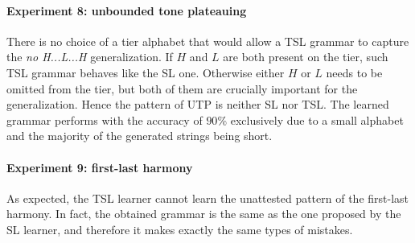 \paragraph{Experiment 8: unbounded tone plateauing}

There is no choice of a tier alphabet that would allow a TSL grammar to capture the \emph{no H...L...H} generalization.
If $H$ and $L$ are both present on the tier, such TSL grammar behaves like the SL one.
Otherwise either $H$ or $L$ needs to be omitted from the tier, but both of them are crucially important for the generalization.
Hence the pattern of UTP is neither SL nor TSL.
The learned grammar performs with the accuracy of $90$\% exclusively due to a small alphabet and the majority of the generated strings being short.

\begin{table}[h!]
\centering
{}
\caption{TSL learning of unbounded tone plateauing; abstract representation.}
\end{table}


\paragraph{Experiment 9: first-last harmony}

As expected, the TSL learner cannot learn the unattested pattern of the first-last harmony.
In fact, the obtained grammar is the same as the one proposed by the SL learner, and therefore it makes exactly the same types of mistakes.

